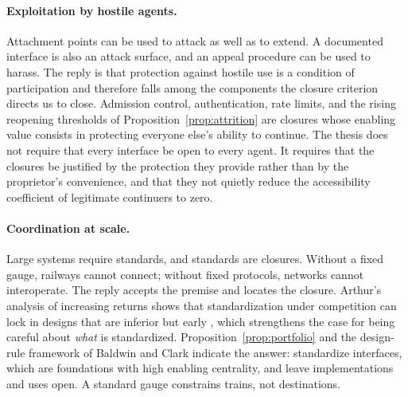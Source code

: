 \paragraph{Exploitation by hostile agents.} Attachment points can be used to attack as well as to extend. A documented interface is also an attack surface, and an appeal procedure can be used to harass. The reply is that protection against hostile use is a condition of participation and therefore falls among the components the closure criterion directs us to close. Admission control, authentication, rate limits, and the rising reopening thresholds of Proposition~\ref{prop:attrition} are closures whose enabling value consists in protecting everyone else's ability to continue. The thesis does not require that every interface be open to every agent. It requires that the closures be justified by the protection they provide rather than by the proprietor's convenience, and that they not quietly reduce the accessibility coefficient of legitimate continuers to zero.

\paragraph{Coordination at scale.} Large systems require standards, and standards are closures. Without a fixed gauge, railways cannot connect; without fixed protocols, networks cannot interoperate. The reply accepts the premise and locates the closure. Arthur's analysis of increasing returns shows that standardization under competition can lock in designs that are inferior but early \cite{arthur1989}, which strengthens the case for being careful about \emph{what} is standardized. Proposition~\ref{prop:portfolio} and the design-rule framework of Baldwin and Clark \cite{baldwinclark2000} indicate the answer: standardize interfaces, which are foundations with high enabling centrality, and leave implementations and uses open. A standard gauge constrains trains, not destinations.

